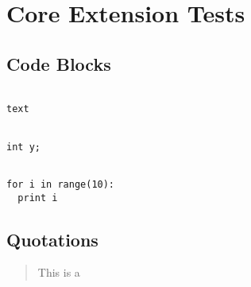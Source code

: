 
\chapter{\label{core-extension-tests}Core Extension Tests}

\section{\label{code-blocks}Code Blocks}

\begin{verbatim}

text

\end{verbatim}

\begin{verbatim}

int y;

\end{verbatim}

\begin{verbatim}

for i in range(10):
  print i

\end{verbatim}

\section{\label{quotations}Quotations}

\begin{quote}

\par
This is a
\end{quote}
